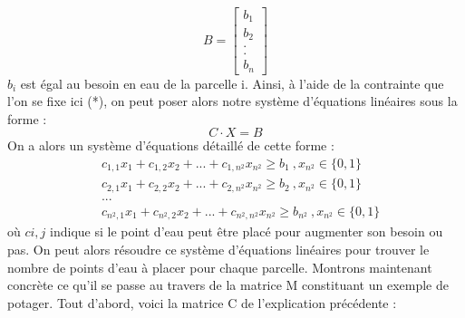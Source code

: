 \documentclass[french,a4paper]{article}
\begin{document}
\newline \[B = \begin{bmatrix} b_1 \\ b_2 \\ . \\ . \\ b_n \end{bmatrix}\]
\newline $b_i$ est égal au besoin en eau de la parcelle i.
\newline Ainsi, à l'aide de la contrainte que l'on se fixe ici (*), on peut poser alors notre système d'équations linéaires sous la forme :
\newline \begin{equation} C \cdot X = B \end{equation}
\newline
\newline On a alors un système d'équations détaillé de cette forme :
\newline
\begin{equation}
    \begin{aligned}
         & c_{1,1}x_1+c_{1,2}x_2+...+c_{1,n^2}x_{n^2} \ge b_1 \ , x_{n^2} \in \{0,1\}           \\
         & c_{2,1}x_1+c_{2,2}x_2+...+c_{2,n^2}x_{n^2} \ge b_2 \ , x_{n^2} \in \{0,1\}           \\
         & ...                                                                                  \\
         & c_{n^2,1}x_1+c_{n^2,2}x_2+...+c_{n^2,n^2}x_{n^2} \ge b_{n^2} \ , x_{n^2} \in \{0,1\}
    \end{aligned}
\end{equation}
\newline
\newline où $ci,j$ indique si le point d'eau peut être placé pour augmenter son besoin ou pas.
\newline On peut alors résoudre ce système d'équations linéaires pour trouver le nombre de points d'eau à placer pour chaque parcelle.
\newline Montrons maintenant concrète ce qu'il se passe au travers de la matrice M constituant un exemple de potager.
\newline Tout d'abord, voici la matrice C de l'explication précédente :
\end{document}
